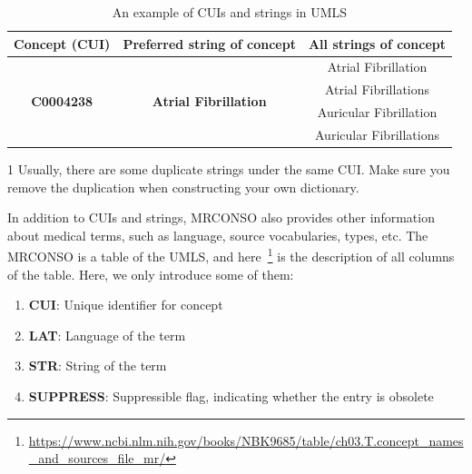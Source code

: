 \begin{table}[ht]
\centering

\begin{threeparttable}[b]
    \caption{An example of CUIs and strings in UMLS}
    \label{tab:Identifiers in UMLS}
    
    \begin{tabular}{ccc}
    \toprule
    \textbf{Concept (CUI)}             & \textbf{Preferred string of concept}            & \textbf{All strings of concept}\tnote{1} \\ \midrule
    \multirow{4}{*}{\textbf{C0004238}} & \multirow{4}{*}{\textbf{Atrial Fibrillation}} & Atrial Fibrillation         \\ 
     &  & Atrial Fibrillations    \\  
     &  & Auricular Fibrillation  \\ 
     &  & Auricular Fibrillations \\ 
    \bottomrule
    \end{tabular}
    
    \begin{tablenotes}
    \item [1] Usually, there are some duplicate strings under the same CUI. Make sure you remove the duplication when constructing your own dictionary. 
    \end{tablenotes}

\end{threeparttable}

\end{table}


In addition to CUIs and strings, MRCONSO also provides other information about medical terms, such as language, source vocabularies, types, etc. The MRCONSO is a table of the UMLS, and here~\footnote{\url{https://www.ncbi.nlm.nih.gov/books/NBK9685/table/ch03.T.concept_names_and_sources_file_mr/}} is the description of all columns of the table. Here, we only introduce some of them:

\begin{enumerate}
  \item \textbf{CUI}: Unique identifier for concept
  \item \textbf{LAT}: Language of the term
  \item \textbf{STR}: String of the term
  \item \textbf{SUPPRESS}: Suppressible flag, indicating whether the entry is obsolete
\end{enumerate}

